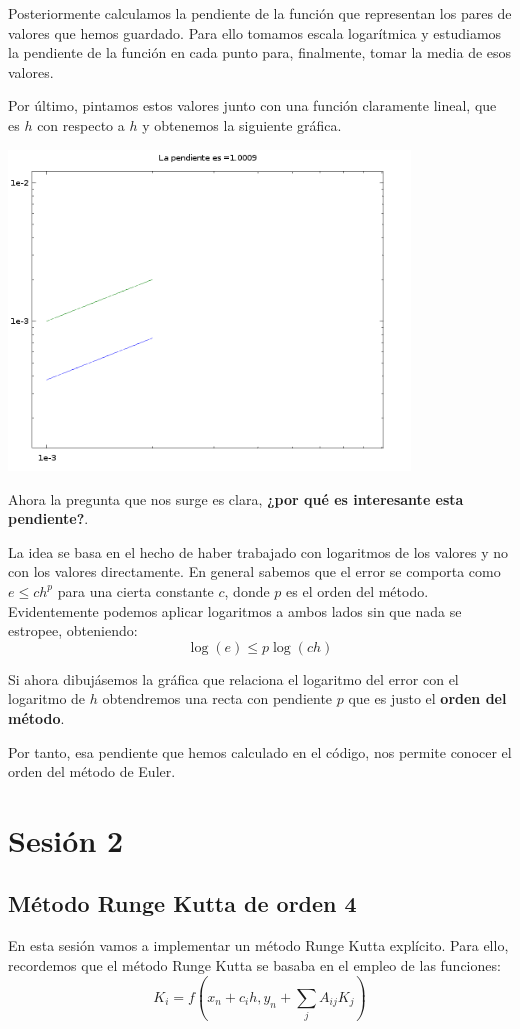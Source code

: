 Posteriormente calculamos la pendiente de la función que representan los pares de valores que hemos guardado. Para ello tomamos escala logarítmica y estudiamos la pendiente de la función en cada punto para, finalmente, tomar la media de esos valores.

Por último, pintamos estos valores junto con una función claramente lineal, que es $h$ con respecto a $h$ y obtenemos la siguiente gráfica.

\begin{center}
\includegraphics[width=0.8\textwidth]{img/figure2.png}
\end{center}

Ahora la pregunta que nos surge es clara, \textbf{¿por qué es interesante esta pendiente?}.

La idea se basa en el hecho de haber trabajado con logaritmos de los valores y no con los valores directamente. En general sabemos que el error se comporta como $e \leq c h^p$ para una cierta constante $c$, donde $p$ es el orden del método. Evidentemente podemos aplicar logaritmos a ambos lados sin que nada se estropee, obteniendo:
\[\log(e) \leq p \log(ch)\]

Si ahora dibujásemos la gráfica que relaciona el logaritmo del error con el logaritmo de $h$ obtendremos una recta con pendiente $p$ que es justo el \textbf{orden del método}.

Por tanto, esa pendiente que hemos calculado en el código, nos permite conocer el orden del método de Euler.

\section{Sesión 2}
\subsection{Método Runge Kutta de orden 4}
En esta sesión vamos a implementar un método Runge Kutta explícito. Para ello, recordemos que el método Runge Kutta se basaba en el empleo de las funciones:
\[K_i = f(x_n+c_ih,y_n+\sum_j A_{ij}K_j)\]

